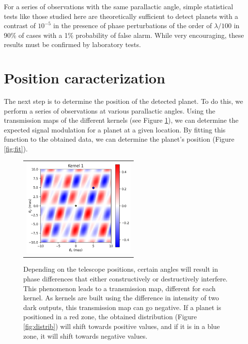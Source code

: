 \documentclass[]{spie}  %
\begin{document}
For a series of observations with the same parallactic angle, simple statistical tests like those studied here are theoretically sufficient to detect planets with a contrast of $10^{-5}$ in the presence of phase perturbations of the order of $\lambda / 100$ in 90\% of cases with a 1\% probability of false alarm. While very encouraging, these results must be confirmed by laboratory tests.

\section{Position caracterization}

The next step is to determine the position of the detected planet. To do this, we perform a series of observations at various parallactic angles. Using the transmission maps of the different kernels (see Figure \ref{fig:transmission_map}), we can determine the expected signal modulation for a planet at a given location. By fitting this function to the obtained data, we can determine the planet's position (Figure \ref{fig:fit}).

\begin{figure} [ht]
    \begin{center}
    \begin{tabular}{c}
    \includegraphics[height=5cm]{img/transmission_map.png}
    \end{tabular}
    \end{center}
    \caption[transmission_map] 
    { \label{fig:transmission_map} 
    Depending on the telescope positions, certain angles will result in phase differences that either constructively or destructively interfere. This phenomenon leads to a transmission map, different for each kernel. As kernels are built using the difference in intensity of two dark outputs, this transmission map can go negative. If a planet is positioned in a red zone, the obtained distribution (Figure \ref{fig:distrib}) will shift towards positive values, and if it is in a blue zone, it will shift towards negative values.}
\end{figure}
\end{document}
